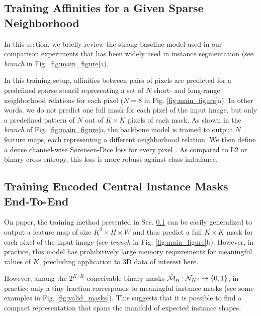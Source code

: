 \subsection{Training Affinities for a Given Sparse Neighborhood}\label{sec:affs_from_sparse}
In this section, we briefly review the strong baseline model used in our comparison experiments that has been widely used in instance segmentation \cite{liu2018affinity,Gao_2019_ICCV,lee2017superhuman,wolf2018mutex,bailoni2019generalized} (see \emph{\sparseBr branch} in Fig. \ref{fig:main_figure}a).

In this training setup, affinities between pairs of pixels are predicted for a predefined sparse stencil representing a set of $N$ short- and long-range neighborhood relations for each pixel ($N=8$ in Fig. \ref{fig:main_figure}a). In other words, we do not predict one full \maskname mask for each pixel of the input image, but only a predefined pattern of $N$ out of $K\times K$ pixels of each \maskname mask. 
As shown in the \emph{\sparseBr branch} of Fig. \ref{fig:main_figure}a, the backbone model is trained to output $N$ feature maps, each representing a different neighborhood relation. We then define a dense channel-wise S\o rensen-Dice loss for every pixel \cite{wolf2018mutex,dice1945measures,sorensen1948method}.
As compared to L2 or binary cross-entropy, this loss is more robust against class imbalance.


\subsection{Training Encoded Central Instance Masks End-To-End}\label{sec:encoding_masks}
On paper, the training method presented in Sec. \ref{sec:affs_from_sparse} can be easily generalized to output a feature map of size $K^2 \times H \times W$ and thus predict a full $K\times K$ \maskname mask for each pixel of the input image (see \emph{\denseBr branch} in Fig. \ref{fig:main_figure}b).
However, in practice, this model has prohibitively large memory requirements for meaningful values of $K$, precluding application to 3D data of interest here.

However, among the $2^{K\cdot K}$ conceivable binary masks $\hat{\mathcal{M}}_{\bm{u}}: \mathcal{N}_{K^2} \rightarrow \{0,1\}$, in practice only a tiny fraction corresponds to meaningful instance masks (see some examples in Fig. \ref{fig:valid_masks}). 
This suggests that it is possible to find a compact representation that spans the manifold of expected instance shapes.


